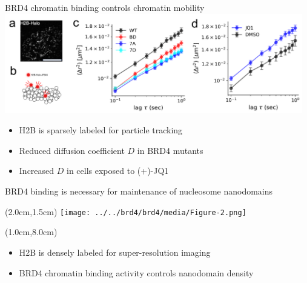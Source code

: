 \documentclass{beamer}					%
\begin{document}
\begin{frame}{BRD4 chromatin binding controls chromatin mobility}
\includegraphics[width=13cm]{../../brd4/brd4/media/Figure-3}
\vspace{0.1in}
\begin{itemize}
\item H2B is sparsely labeled for particle tracking 
\item Reduced diffusion coefficient $D$ in BRD4 mutants
\item Increased $D$ in cells exposed to (+)-JQ1
\end{itemize}

\end{frame}


\begin{frame}{BRD4 binding is necessary for maintenance of nucleosome nanodomains}
\begin{textblock*}{10cm}(2.0cm,1.5cm)
\texttt{[image: ../../brd4/brd4/media/Figure-2.png]}
\end{textblock*}

\begin{textblock*}{13cm}(1.0cm,8.0cm)
\begin{itemize}
\item H2B is densely labeled for super-resolution imaging
\item BRD4 chromatin binding activity controls nanodomain density
\end{itemize}
\end{textblock*}

\end{frame}
\end{document}
